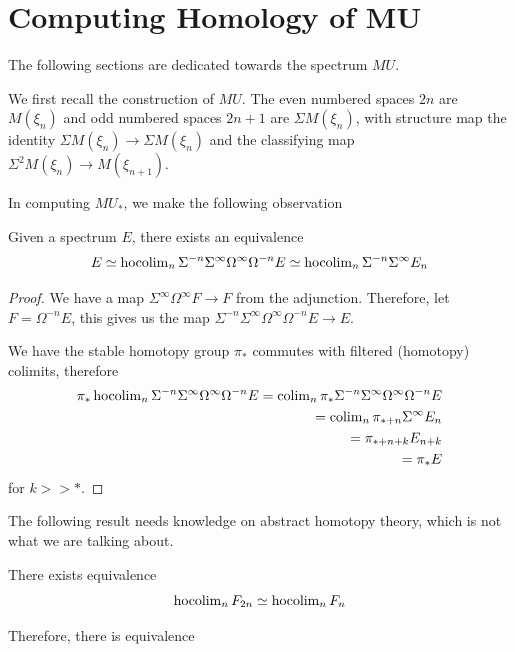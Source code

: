 \section{Computing Homology of MU}\label{sec:chromatichomotopy-computingmu}
The following sections are dedicated towards the spectrum $MU$.
 
We first recall the construction of $MU$. The even numbered spaces $2n$ are $M(\xi_n)$ 
and odd numbered spaces $2n+1$ are $\Sigma M(\xi_n)$, with structure map the identity 
$\Sigma M(\xi_n)\to \Sigma M(\xi_n)$ and the classifying map $\Sigma^2 M(\xi_n)\to M(\xi_{n+1})$. 

In computing $MU_*$, we make the following observation
\begin{lemma}
 Given a spectrum $E$, there exists an equivalence 
 \[
 E\simeq \operatorname{hocolim}_n \Sigma^{-n}\Sigma^{\infty}\Omega^\infty\Omega^{-n}E\simeq  \operatorname{hocolim}_n \Sigma^{-n}\Sigma^{\infty} E_n
 \]
\end{lemma}
\begin{proof}
    We have a map $\Sigma^{\infty}\Omega^\infty F\to F$ from the adjunction. Therefore, let $F=\Omega^{-n}E$, this gives us the map $\Sigma^{-n}\Sigma^{\infty}\Omega^\infty\Omega^{-n}E\to E$.

    We have the stable homotopy group $\pi_*$ commutes with filtered (homotopy) colimits, therefore 
    \begin{align*}
    \pi_* \operatorname{hocolim}_n \Sigma^{-n}\Sigma^{\infty}\Omega^\infty\Omega^{-n}E=\operatorname{colim}_n \pi_*\Sigma^{-n}\Sigma^{\infty}\Omega^\infty\Omega^{-n}E
    \\=\operatorname{colim}_n \pi_{*+n}\Sigma^{\infty}E_n
    \\=  \pi_{*+n+k}E_{n+k}
    \\= \pi_*E
    \end{align*}for $k>>*$.
\end{proof}
The following result needs knowledge on abstract homotopy theory, which is not what we are talking about.
\begin{lemma}
    There exists equivalence
    \[
    \operatorname{hocolim}_{n}F_{2n}\simeq \operatorname{hocolim}_{n}F_n
    \]
\end{lemma}

Therefore, there is equivalence

